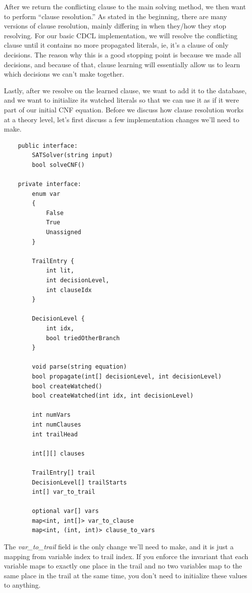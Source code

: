 \documentclass[oneside]{book}
\begin{document}
After we return the conflicting clause to the main solving method, we then want to 
perform ``clause resolution.'' As stated in the beginning, there are many versions of 
clause resolution, mainly differing in when they/how they stop resolving. For our basic 
CDCL implementation, we will resolve the conflicting clause until it contains no more 
propagated literals, ie, it's a clause of only decisions. The reason why this is a good 
stopping point is because we made all decisions, and because of that, clause learning 
will essentially allow us to learn which decisions we can't make together. 

Lastly, after we resolve on the learned clause, we want to add it to the database,
and we want to initialize its watched literals so that we can use it as if it were 
part of our initial CNF equation. Before we discuss how clause resolution works at 
a theory level, let's first discuss a few implementation changes we'll need to make.

\begin{lstlisting}
    public interface:
        SATSolver(string input)
        bool solveCNF()

    private interface:
        enum var
        {
            False
            True
            Unassigned
        }

        TrailEntry {
            int lit,
            int decisionLevel,
            int clauseIdx
        }

        DecisionLevel {
            int idx,
            bool triedOtherBranch
        }

        void parse(string equation)
        bool propagate(int[] decisionLevel, int decisionLevel)
        bool createWatched()
        bool createWatched(int idx, int decisionLevel)

        int numVars
        int numClauses
        int trailHead

        int[][] clauses
        
        TrailEntry[] trail
        DecisionLevel[] trailStarts
        int[] var_to_trail

        optional var[] vars
        map<int, int[]> var_to_clause
        map<int, (int, int)> clause_to_vars
\end{lstlisting}

The \textit{var\_to\_trail} field is the only change we'll need to make, and it 
is just a mapping from variable index to trail index. If you enforce the invariant 
that each variable maps to exactly one place in the trail and no two variables 
map to the same place in the trail at the same time, you don't need to initialize 
these values to anything. 
\end{document}
